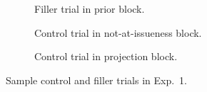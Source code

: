 \documentclass[11pt,fleqn]{article}
\newcommand{\6}{\mbox{$[\hspace*{-.6mm}[$}}
\newcommand{\9}{\mbox{$]\hspace*{-.6mm}]$}}
\begin{document}
\begin{figure}[h!]
\centering
\begin{subfigure}[t]{0.5\textwidth}
        \centering
{}
\caption{Filler trial in prior block.}\label{fig-exp1-prior-filler}
 \end{subfigure}
\begin{subfigure}[t]{0.5\textwidth}
\centering
{} 
\caption{Control trial in not-at-issueness block.}\label{fig-exp1-nai-control}
\end{subfigure}%
\begin{subfigure}[t]{0.5\textwidth}
\centering
{} 
\caption{Control trial in projection block.}\label{fig-exp1-projection-control}
\end{subfigure}

\caption{Sample control and filler trials in Exp.~1.}
\end{figure}
\end{document}
